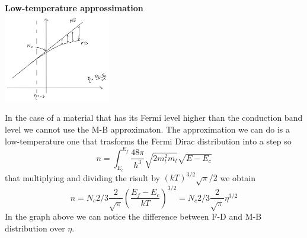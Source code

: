 {\bf Low-temperature approssimation}\\


\centering
\includegraphics[width=0.35\textwidth]{mbfd.png}\\
\raggedright

In the case of a material that has its Fermi level higher than the conduction band level we cannot use the M-B approximaton. The approximation we can do is a low-temperature one that trasforms the Fermi Dirac distribution into a step so
\begin{equation}
n=\int^{E_f}_{E_c}\frac{48\pi}{h^3}\sqrt{2m_t^2m_l}\sqrt{E-E_c}
\end{equation}
that multiplying and dividing the risult by $(kT)^{3/2}\sqrt{\pi}/2$ we obtain
\begin{equation}
n=N_c 2/3 \frac{2}{\sqrt{\pi}}\left(\frac{E_f-E_c}{kT}\right)^{3/2}=N_c 2/3 \frac{2}{\sqrt{\pi}}\eta^{3/2}
\end{equation}
In the graph above we can notice the difference between F-D and M-B distribution over $\eta$.\\
